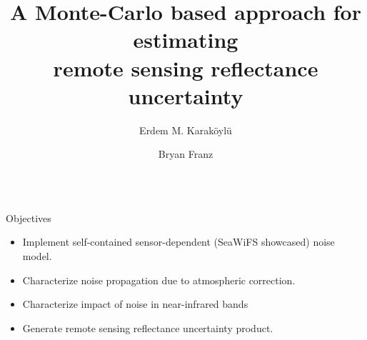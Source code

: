 \documentclass[final]{beamer}
\title{A Monte-Carlo based approach for estimating \\remote sensing reflectance uncertainty} %
\author{Erdem M. Karak\"{o}yl\"{u} \and Bryan Franz} %
\institute{NASA Goddard Space Flight Center, Greenbelt, MD, 20771} %
\newlength{\sepwid}
\newlength{\onecolwid}
\begin{document}

\setlength\belowdisplayshortskip{2ex} %

\begin{frame}[t] %

\begin{columns}[t] %


\begin{column}{\onecolwid} %


\begin{alertblock}{Objectives}

\begin{itemize}
\item Implement self-contained sensor-dependent (SeaWiFS showcased) noise model.
\item Characterize noise propagation due to atmospheric correction.
\item Characterize impact of noise in near-infrared bands
\item Generate remote sensing reflectance uncertainty product.
\end{itemize}

\end{alertblock}



\end{column}
\end{columns}
\end{frame}
\end{document}
